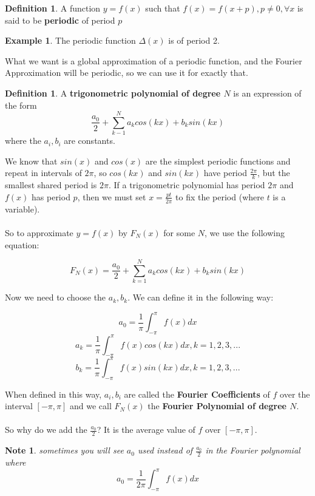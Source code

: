 \documentclass[12pt]{article}
\theoremstyle{plain}
\newtheorem*{note}{Note}
\theoremstyle{definition}
\newtheorem{definition}[theorem]{Definition}
\newtheorem{example}[theorem]{Example}
\begin{document}
\begin{definition}
	A function $y=f(x)$ such that $f(x)=f(x+p), p \neq 0, \forall x$ is said to be \textbf{periodic} of period $p$
\end{definition}

\begin{example}
	The periodic function $\Delta (x)$ is of period 2.
\end{example}

What we want is a global approximation of a periodic function, and the Fourier Approximation will be periodic, so we can use it for exactly that.

\begin{definition}
	A \textbf{trigonometric polynomial of degree $N$} is an expression of the form
	$$\frac{a_0}{2}+ \sum^N_{k-1} a_k cos(kx) + b_k sin(kx)$$ where the $a_i, b_i$ are constants.
\end{definition}

We know that $sin(x)$ and $cos(x)$ are the simplest periodic functions and repeat in intervals of $2\pi$, so $cos(kx)$ and $sin(kx)$ have period $\frac{2\pi}{k}$, but the smallest shared period is $2\pi$. If a trigonometric polynomial has period $2\pi$ and $f(x)$ has period $p$, then we must set $x=\frac{pt}{2\pi}$ to fix the period (where $t$ is a variable).\\
\\
So to approximate $y=f(x)$ by $F_N (x)$ for some $N$, we use the following equation:

$$F_N (x) = \frac{a_0}{2}+ \sum^N_{k=1} a_k cos(kx) + b_k sin(kx)$$

Now we need to choose the $a_k, b_k$. We can define it in the following way:

$$a_0 = \frac{1}{\pi} \int^{\pi}_{-\pi} f(x) dx$$
$$a_k = \frac{1}{\pi} \int^{\pi}_{-\pi} f(x) cos(kx) dx, k=1,2,3,...$$
$$b_k = \frac{1}{\pi} \int^{\pi}_{-\pi} f(x) sin(kx) dx, k=1,2,3,...$$

When defined in this way, $a_i, b_i$ are called the \textbf{Fourier Coefficients} of $f$ over the interval $[-\pi, \pi]$ and we call $F_N (x)$ the \textbf{Fourier Polynomial of degree $N$}.\\
\\
So why do we add the $\frac{a_0}{2}$? It is the average value of $f$ over $[-\pi, \pi]$.

\begin{note}
	sometimes you will see $a_0$ used instead of $\frac{a_0}{2}$ in the Fourier polynomial where $$a_0 = \frac{1}{2\pi} \int^{\pi}_{-\pi} f(x) dx$$
\end{note}
\end{document}
